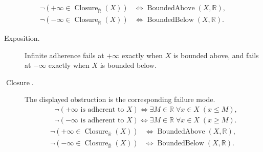 \begin{remark*}
\[
\begin{aligned}
\neg\left(+\infty\in\operatorname{Closure}_{\overline{\mathbb{R}}}(X)\right)
&\Longleftrightarrow
\operatorname{BoundedAbove}(X,\mathbb{R}),\\
\neg\left(-\infty\in\operatorname{Closure}_{\overline{\mathbb{R}}}(X)\right)
&\Longleftrightarrow
\operatorname{BoundedBelow}(X,\mathbb{R}).
\end{aligned}
\]
\end{remark*}

\begin{remark*}
\begin{description}
  \item[Exposition.]
Infinite adherence fails at $+\infty$ exactly when $X$ is bounded above,
and fails at $-\infty$ exactly when $X$ is bounded below.


  \item[\(\operatorname{Closure}.\)]
  The displayed obstruction is the corresponding failure mode.
  \[
\begin{aligned}
&\neg(+\infty\text{ is adherent to }X)
\Longleftrightarrow
\exists M\in\mathbb{R}\;\forall x\in X\;(x\le M),\\
&\neg(-\infty\text{ is adherent to }X)
\Longleftrightarrow
\exists M\in\mathbb{R}\;\forall x\in X\;(x\ge M).
\end{aligned}
  \]
  \[
\begin{aligned}
\neg\left(+\infty\in\operatorname{Closure}_{\overline{\mathbb{R}}}(X)\right)
&\Longleftrightarrow
\operatorname{BoundedAbove}(X,\mathbb{R}),\\
\neg\left(-\infty\in\operatorname{Closure}_{\overline{\mathbb{R}}}(X)\right)
&\Longleftrightarrow
\operatorname{BoundedBelow}(X,\mathbb{R}).
\end{aligned}
  \]
\end{description}
\end{remark*}

